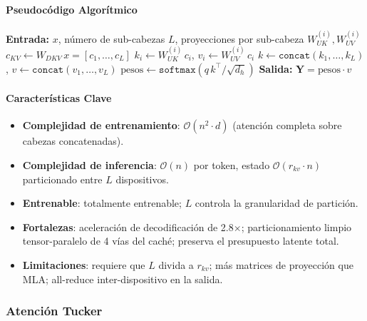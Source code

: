 \paragraph{Pseudocódigo Algorítmico}
\begin{algorithmic}[1]
\State \textbf{Entrada:} $x$, número de sub-cabezas $L$, proyecciones por sub-cabeza $W_{UK}^{(i)}, W_{UV}^{(i)}$
\State $c_{KV} \gets W_{DKV}\, x = [c_1, \ldots, c_L]$ 
    \State $k_i \gets W_{UK}^{(i)}\, c_i$, \quad $v_i \gets W_{UV}^{(i)}\, c_i$
\EndFor
\State $k \gets \texttt{concat}(k_1, \ldots, k_L)$, \quad $v \gets \texttt{concat}(v_1, \ldots, v_L)$
\State $\text{pesos} \gets \texttt{softmax}(q\, k^\top / \sqrt{d_h})$
\State \textbf{Salida:} $\mathbf{Y} = \text{pesos} \cdot v$
\end{algorithmic}

\paragraph{Características Clave}
\begin{itemize}[leftmargin=*]
    \item \textbf{Complejidad de entrenamiento}: $\mathcal{O}(n^2 \cdot d)$ (atención completa sobre cabezas concatenadas).
    \item \textbf{Complejidad de inferencia}: $\mathcal{O}(n)$ por token, estado $\mathcal{O}(r_{kv} \cdot n)$ particionado entre $L$ dispositivos.
    \item \textbf{Entrenable}: totalmente entrenable; $L$ controla la granularidad de partición.
    \item \textbf{Fortalezas}: aceleración de decodificación de 2.8$\times$; particionamiento limpio tensor-paralelo de 4 vías del caché; preserva el presupuesto latente total.
    \item \textbf{Limitaciones}: requiere que $L$ divida a $r_{kv}$; más matrices de proyección que MLA; all-reduce inter-dispositivo en la salida.
\end{itemize}

\subsubsection{Atención Tucker}

